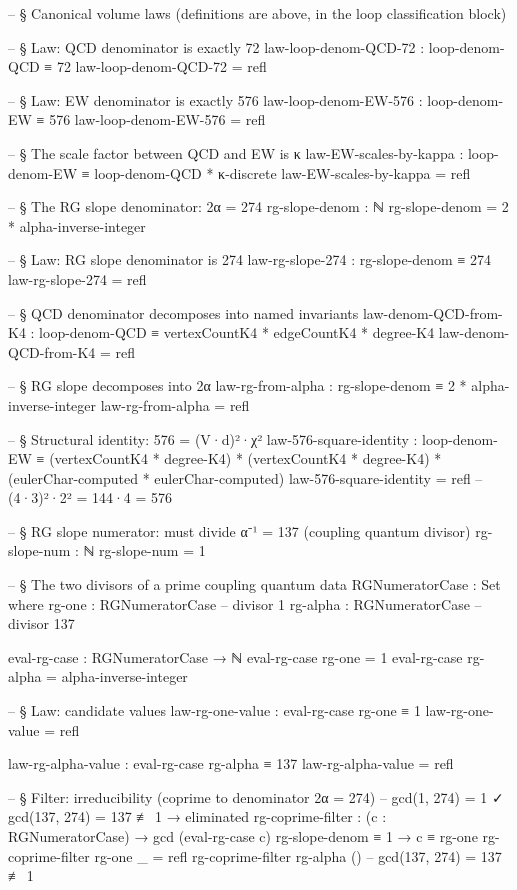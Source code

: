 \documentclass[11pt,a4paper]{book}
\begin{document}
\begin{code}
-- § Canonical volume laws (definitions are above, in the loop classification block)

-- § Law: QCD denominator is exactly 72
law-loop-denom-QCD-72 : loop-denom-QCD ≡ 72
law-loop-denom-QCD-72 = refl

-- § Law: EW denominator is exactly 576
law-loop-denom-EW-576 : loop-denom-EW ≡ 576
law-loop-denom-EW-576 = refl

-- § The scale factor between QCD and EW is κ
law-EW-scales-by-kappa : loop-denom-EW ≡ loop-denom-QCD * κ-discrete
law-EW-scales-by-kappa = refl

-- § The RG slope denominator: 2α = 274
rg-slope-denom : ℕ
rg-slope-denom = 2 * alpha-inverse-integer

-- § Law: RG slope denominator is 274
law-rg-slope-274 : rg-slope-denom ≡ 274
law-rg-slope-274 = refl

-- § QCD denominator decomposes into named invariants
law-denom-QCD-from-K4 : loop-denom-QCD ≡ vertexCountK4 * edgeCountK4 * degree-K4
law-denom-QCD-from-K4 = refl

-- § RG slope decomposes into 2α
law-rg-from-alpha : rg-slope-denom ≡ 2 * alpha-inverse-integer
law-rg-from-alpha = refl

-- § Structural identity: 576 = (V·d)²·χ²
law-576-square-identity : loop-denom-EW ≡ (vertexCountK4 * degree-K4) * (vertexCountK4 * degree-K4) * (eulerChar-computed * eulerChar-computed)
law-576-square-identity = refl   -- (4·3)²·2² = 144·4 = 576

-- § RG slope numerator: must divide α⁻¹ = 137 (coupling quantum divisor)
rg-slope-num : ℕ
rg-slope-num = 1

-- § The two divisors of a prime coupling quantum
data RGNumeratorCase : Set where
  rg-one   : RGNumeratorCase   -- divisor 1
  rg-alpha : RGNumeratorCase   -- divisor 137

eval-rg-case : RGNumeratorCase → ℕ
eval-rg-case rg-one   = 1
eval-rg-case rg-alpha = alpha-inverse-integer

-- § Law: candidate values
law-rg-one-value : eval-rg-case rg-one ≡ 1
law-rg-one-value = refl

law-rg-alpha-value : eval-rg-case rg-alpha ≡ 137
law-rg-alpha-value = refl

-- § Filter: irreducibility (coprime to denominator 2α = 274)
-- gcd(1, 274) = 1 ✓   gcd(137, 274) = 137 ≢ 1 → eliminated
rg-coprime-filter :
  (c : RGNumeratorCase) →
  gcd (eval-rg-case c) rg-slope-denom ≡ 1 →
  c ≡ rg-one
rg-coprime-filter rg-one   _ = refl
rg-coprime-filter rg-alpha ()   -- gcd(137, 274) = 137 ≢ 1


\end{code}
\end{document}

